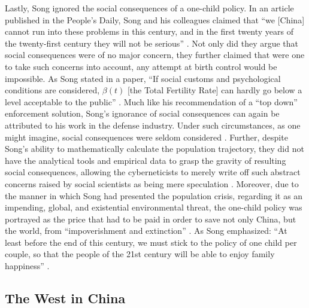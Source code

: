 \documentclass[12pt, a4paper, twoside]{article}
\begin{document}
Lastly, Song ignored the social consequences of a one-child policy. In an article published in the People's Daily, Song and his colleagues claimed that “we [China] cannot run into these problems in this century, and in the first twenty years of the twenty-first century they will not be serious” \autocite[p.\ 248]{Greenhalgh2008JustOneChild}. Not only did they argue that social consequences were of no major concern, they further claimed that were one to take such concerns into account, any attempt at birth control would be impossible. As Song stated in a paper, “If social customs and psychological conditions are considered, $\beta(t)$ [the Total Fertility Rate] can hardly go below a level acceptable to the public” \autocite[p.\ 251]{SongTuanYu1985}. Much like his recommendation of a “top down” enforcement solution, Song’s ignorance of social consequences can again be attributed to his work in the defense industry. Under such circumstances, as one might imagine, social consequences were seldom considered \autocite[p.\ 153]{Greenhalgh2008JustOneChild}. Further, despite Song’s ability to mathematically calculate the population trajectory, they did not have the analytical tools and empirical data to grasp the gravity of resulting social consequences, allowing the cyberneticists to merely write off such abstract concerns raised by social scientists as being mere speculation \autocite[p.\ 286]{Greenhalgh2008JustOneChild}. Moreover, due to the manner in which Song had presented the population crisis, regarding it as an impending, global, and existential environmental threat, the one-child policy was portrayed as the price that had to be paid in order to save not only China, but the world, from “impoverishment and extinction” \autocite[p.\ 287]{Greenhalgh2008JustOneChild}. As Song emphasized: “At least before the end of this century, we must stick to the policy of one child per couple, so that the people of the 21st century will be able to enjoy family happiness” \autocite[p.\ 4]{Song1985SystemsScienceReforms}.

\subsection{The West in China}
\end{document}
